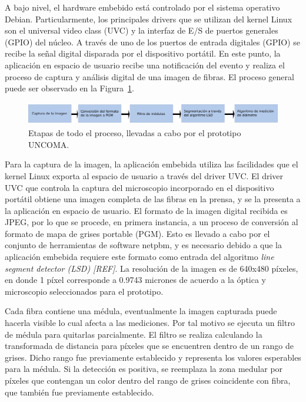 \documentclass[runningheads,a4paper]{llncs}
\begin{document}
A bajo nivel, el hardware embebido está controlado por el sistema operativo Debian. Particularmente, los principales drivers que se utilizan del kernel Linux son el universal video class (UVC) y la interfaz de E/S de puertos generales (GPIO) del núcleo.
A través de uno de los puertos de entrada digitales (GPIO) se recibe la señal digital disparada por el dispositivo portátil. En este punto, la aplicación en espacio de usuario recibe una notificación del evento y realiza el proceso de captura y análisis digital de una imagen de fibras. El proceso general puede ser observado en la Figura~\ref{fig:proceso}.
\begin{figure}
\centering
\includegraphics[height=1cm]{proceso}
\caption{Etapas de todo el proceso, llevadas a cabo por el prototipo UNCOMA.}
\label{fig:proceso}
\end{figure}

Para la captura de la imagen, la aplicación embebida utiliza las facilidades que el kernel Linux exporta al espacio de usuario a través del driver UVC. El driver UVC que controla la captura del microscopio incorporado en el dispositivo portátil obtiene una imagen completa de las fibras en la prensa, y se la presenta a la aplicación en espacio de usuario.
El formato de la imagen digital recibida es JPEG, por lo que se procede, en primera instancia, a un proceso de conversión al formato de mapa de grises portable (PGM). Esto es llevado a cabo por el conjunto de herramientas de software netpbm, y es necesario debido a que la aplicación embebida requiere este formato como entrada del algoritmo {\it line segment detector (LSD) [REF]}.
La resolución de la imagen es de 640x480 píxeles, en donde 1 píxel corresponde a 0.9743 micrones de acuerdo a la óptica y microscopio seleccionados para el prototipo.

Cada fibra contiene una médula, eventualmente la imagen capturada puede hacerla visible lo cual afecta a 
las mediciones. Por tal motivo se ejecuta un filtro de médula para quitarlas parcialmente. El filtro se realiza calculando la transformada de distancia para píxeles que se encuentren dentro de un rango de grises. 
Dicho rango fue previamente establecido y representa los valores esperables para la médula. Si la detección es positiva, se reemplaza la zona medular por píxeles que contengan un color dentro del rango de grises  
coincidente con fibra, que también fue previamente establecido.
\end{document}
